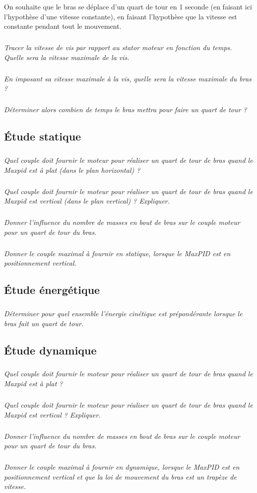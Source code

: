 \documentclass[10pt,fleqn]{article} %
\begin{document}
\begin{multicols}{2}
On souhaite que le bras se déplace d'un quart de tour en 1 seconde (en faisant ici l'hypothèse d'une vitesse constante), en faisant l'hypothèse que la vitesse est constante pendant tout le mouvement. 

\subparagraph{}\textit{Tracer la vitesse de vis par rapport au stator moteur en fonction du temps. Quelle sera la vitesse maximale de la vis.}

\subparagraph{}\textit{En imposant sa vitesse maximale à la vis, quelle sera la vitesse maximale du bras ?}

\subparagraph{}\textit{Déterminer alors combien de temps le bras mettra pour faire un quart de tour ?}


\subsection*{Étude statique}

\subparagraph{}\textit{Quel couple doit fournir le moteur pour réaliser un quart de tour de bras quand le Maxpid est à plat (dans le plan horizontal) ?}

\subparagraph{}\textit{Quel couple doit fournir le moteur pour réaliser un quart de tour de bras quand le Maxpid est vertical (dans le plan vertical) ? Expliquer.}

\subparagraph{}\textit{Donner l'influence du nombre de masses en bout de bras sur le couple moteur pour un quart de tour du bras.}


\subparagraph{}\textit{Donner le couple maximal à fournir en statique, lorsque le MaxPID est en positionnement vertical.}

\subsection*{Étude énergétique}

\subparagraph{}\textit{Déterminer pour quel ensemble l'énergie cinétique est prépondérante lorsque le bras fait un quart de tour.}


\subsection*{Étude dynamique}


\subparagraph{}\textit{Quel couple doit fournir le moteur pour réaliser un quart de tour de bras quand le Maxpid est à plat ?}

\subparagraph{}\textit{Quel couple doit fournir le moteur pour réaliser un quart de tour de bras quand le Maxpid est vertical ? Expliquer.}

\subparagraph{}\textit{Donner l'influence du nombre de masses en bout de bras sur le couple moteur pour un quart de tour du bras.}


\subparagraph{}\textit{Donner le couple maximal à fournir en dynamique, lorsque le MaxPID est en positionnement vertical et que la loi de mouvement du bras est un trapèze de vitesse.}

\end{multicols}
\end{document}
